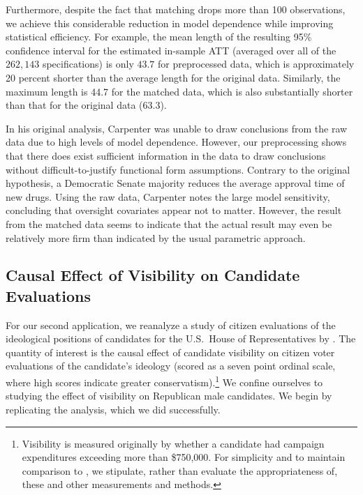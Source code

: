 \documentclass[11pt,titlepage]{article}
\begin{document}
Furthermore, despite the fact that matching drops more than 100
observations, we achieve this considerable reduction in model
dependence while improving statistical efficiency. For example, the
mean length of the resulting 95\% confidence interval for the estimated
in-sample ATT (averaged over all of the $262,143$ specifications) is
only $43.7$ for preprocessed data, which is approximately 20 percent
shorter than the average length for the original data. Similarly, the
maximum length is 44.7 for the matched data, which is also
substantially shorter than that for the original data (63.3).

In his original analysis, Carpenter was unable to draw conclusions
from the raw data due to high levels of model dependence.  However,
our preprocessing shows that there does exist sufficient information
in the data to draw conclusions without difficult-to-justify
functional form assumptions.  Contrary to the original hypothesis, a
Democratic Senate majority reduces the average approval time of new
drugs.  Using the raw data, Carpenter notes the large model
sensitivity, concluding that oversight covariates appear not to
matter.  However, the result from the matched data seems to indicate
that the actual result may even be relatively more firm than indicated
by the usual parametric approach.

\subsection{Causal Effect of Visibility on Candidate
  Evaluations}

For our second application, we reanalyze a study of citizen
evaluations of the ideological positions of candidates for the U.S.\ 
House of Representatives by \citet{Koch02}.  The quantity of interest
is the causal effect of candidate visibility on citizen voter
evaluations of the candidate's ideology (scored as a seven point
ordinal scale, where high scores indicate greater
conservatism).\footnote{Visibility is measured originally by whether a
  candidate had campaign expenditures exceeding more than \$750,000.
  For simplicity and to maintain comparison to \citet{Koch02}, we
  stipulate, rather than evaluate the appropriateness of, these and
  other measurements and methods.}  We confine ourselves to studying
the effect of visibility on Republican male candidates.  We begin by
replicating the analysis, which we did successfully.
\end{document}

